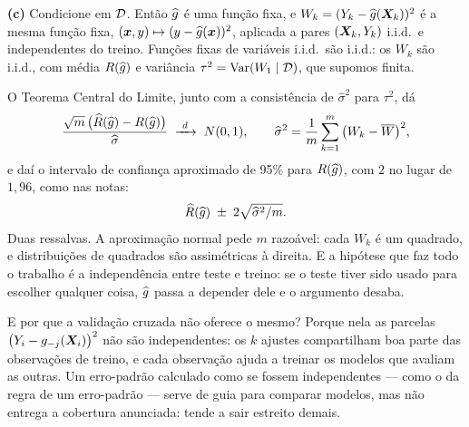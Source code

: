 \begin{solucao}
\smallskip
\textbf{(c)} Condicione em $\mathcal{D}$. Então $\widehat{g}$ é uma função fixa, e
$W_k=(Y_k-\widehat{g}(\bm{X}_k))^2$ é a mesma função fixa, $(\bm{x},y)\mapsto(y-\widehat{g}(\bm{x}))^2$,
aplicada a pares $(\bm{X}_k,Y_k)$ i.i.d.\ e independentes do treino. Funções fixas de
variáveis i.i.d.\ são i.i.d.: os $W_k$ são i.i.d., com média $R(\widehat{g})$ e
variância $\tau^2=\operatorname{Var}(W_1\mid\mathcal{D})$, que supomos finita.

O Teorema Central do Limite, junto com a consistência de $\widehat\sigma^2$ para
$\tau^2$, dá
\[
  \frac{\sqrt m\,\big(\widehat{R}(\widehat{g})-R(\widehat{g})\big)}{\widehat\sigma}
  \;\xrightarrow{\ d\ }\;N(0,1),
  \qquad
  \widehat\sigma^2=\frac1m\sum_{k=1}^m\big(W_k-\overline W\big)^2 ,
\]
e daí o intervalo de confiança aproximado de 95\% para $R(\widehat{g})$, com $2$ no
lugar de $1{,}96$, como nas notas:
\[
  \widehat{R}(\widehat{g})\;\pm\;2\sqrt{\widehat\sigma^2/m}.
\]
Duas ressalvas. A aproximação normal pede $m$ razoável: cada $W_k$ é um quadrado, e
distribuições de quadrados são assimétricas à direita. E a hipótese que faz todo o
trabalho é a independência entre teste e treino: se o teste tiver sido usado para
escolher qualquer coisa, $\widehat{g}$ passa a depender dele e o argumento desaba.

E por que a validação cruzada não oferece o mesmo? Porque nela as parcelas
$\big(Y_i-g_{-j}(\bm{X}_i)\big)^2$ não são independentes: os $k$ ajustes compartilham boa
parte das observações de treino, e cada observação ajuda a treinar os modelos que
avaliam as outras. Um erro-padrão calculado como se fossem independentes --- como o
da regra de um erro-padrão --- serve de guia para comparar modelos, mas não entrega a
cobertura anunciada: tende a sair estreito demais.
\end{solucao}
